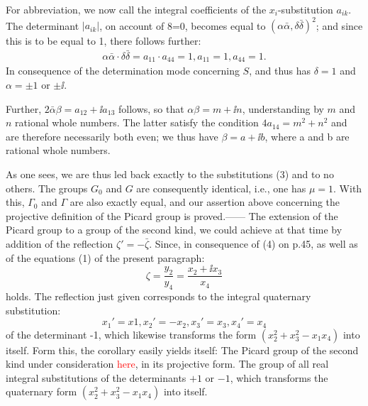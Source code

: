 For abbreviation, we now call the integral coefficients of the $x_i$-substitution $a_{ik}$. The determinant $|a_{ik}|$, on account of 8=0, becomes equal to $(\alpha\bar{\alpha},\delta\bar{\delta})^2$; and since this is to be equal to 1, there follows further:
\begin{align}
    \alpha\bar{\alpha}\cdot\delta\bar{\delta}=a_{11}\cdot a_{44}=1, a_{11}=1, a_{44}=1.
\end{align}
In consequence of the determination mode concerning $S$, and thus has $\delta=1$ and $\alpha=\pm1$ or $\pm\ii$.

Further, $2\bar{\alpha}\beta=a_{12}+\ii a_{13}$ follows, so that $\alpha\beta=m+\ii n$, understanding by $m$ and $n$ rational whole numbers. The latter satisfy the condition $4a_{14}=m^2+n^2$ and are therefore necessarily both even; we thus have $\beta=a+\ii b$, where a and b are rational whole numbers.

As one sees, we are thus led back exactly to the substitutions (3) and to no others. The groups $G_0$ and $G$ are consequently identical, i.e., one has $\mu=1$. With this, $\Gamma_0$ and $\Gamma$ are also exactly equal, and our assertion above concerning the projective definition of the Picard group is proved.——
The extension of the Picard group to a group of the second kind, we could achieve at that time by addition of the reflection $\zeta'=-\bar{\zeta}$. Since, in consequence of (4) on p.45, as well as of the equations (1) of the present paragraph:
$$\zeta=\frac{y_2}{y_4}=\frac{x_2+\ii x_3}{x_4}$$
holds. The reflection just given corresponds to the integral quaternary substitution:
$$x_1'=x1, x_2'=-x_2, x_3'=x_3, x_4'=x_4$$
of the determinant -1, which likewise transforms the form $(x_2^2+x_3^2-x_1x_4)$ into itself. Form this, the corollary easily yields itself: The Picard group of the second kind under consideration \textcolor{red}{here}, in its projective form. The group of all real integral substitutions of the determinants $+1$ or $-1$, which transforms the quaternary form $(x_2^2+x_3^2-x_1x_4)$ into itself.